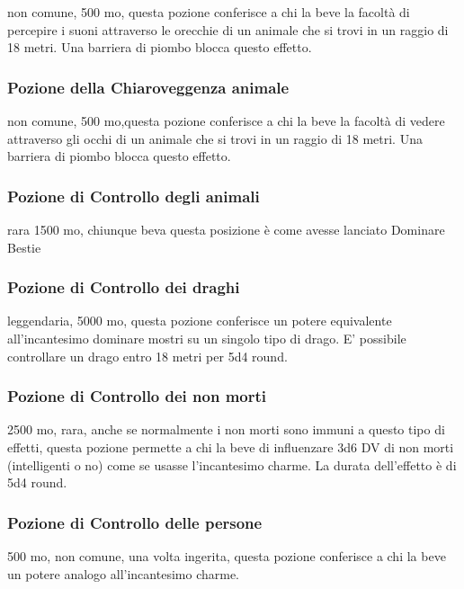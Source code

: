 \begin{multicols}{2}
	non comune, 500 mo, questa pozione conferisce a chi la beve la facoltà di percepire i suoni attraverso le orecchie di un animale che si trovi in un raggio di 18 metri. Una barriera di piombo blocca questo effetto.

	\subsubsection*{Pozione della Chiaroveggenza animale}
	non comune, 500 mo,questa pozione conferisce a chi la beve la facoltà di vedere attraverso gli occhi di un animale che si trovi in un raggio di 18 metri. Una barriera di piombo blocca questo effetto.

	\subsubsection*{Pozione di Controllo degli animali}
	rara 1500 mo, chiunque beva questa posizione è come avesse lanciato Dominare Bestie


	\subsubsection*{Pozione di Controllo dei draghi}
	leggendaria, 5000 mo, questa pozione conferisce un potere equivalente all’incantesimo dominare mostri su un singolo tipo di drago. E' possibile controllare un drago entro 18 metri per 5d4 round.

	\subsubsection*{Pozione di Controllo dei non morti}
	2500 mo, rara, anche se normalmente i non morti sono immuni a questo tipo di effetti, questa pozione permette a chi la beve di influenzare 3d6 DV di non morti (intelligenti o no) come se usasse l'incantesimo charme. La durata dell’effetto è di 5d4 round.

	\subsubsection*{Pozione di Controllo delle persone}
	500 mo, non comune, una volta ingerita, questa pozione conferisce a chi la beve un potere analogo all'incantesimo charme.


\end{multicols}
